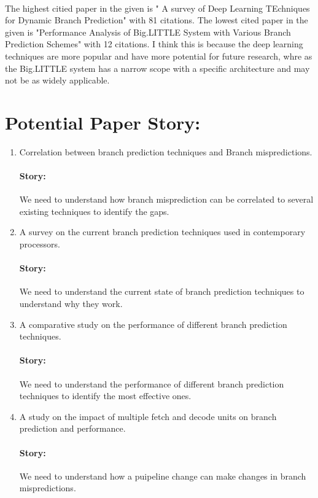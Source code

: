 \documentclass{article}
\begin{document}
\paragraph*{}
The highest citied paper  in the given is " A survey of Deep Learning TEchniques for Dynamic Branch Prediction" with 81 citations.
The lowest cited paper in the given is "Performance Analysis of Big.LITTLE System with Various Branch Prediction Schemes" with 12 citations.
I think this is because the deep learning techniques are more popular and have more potential for future research, whre as the Big.LITTLE system has a narrow scope with a specific architecture and may not be as widely applicable.

\section{Potential Paper Story: }
\begin{enumerate}
    \item Correlation between branch prediction techniques and Branch mispredictions. \paragraph{Story:} We need to understand how branch misprediction can be correlated to several existing techniques to identify the gaps.
    \item A survey on the current branch prediction techniques used in contemporary processors. \paragraph{Story: } We need to understand the current state of branch prediction techniques to understand why they work.
    \item A comparative study on the performance of different branch prediction techniques. \paragraph{Story: } We need to understand the performance of different branch prediction techniques to identify the most effective ones.
    \item A study on the impact of multiple fetch and decode units on branch prediction and performance. \paragraph{Story: } We need to understand how a puipeline change can make changes in branch mispredictions.
\end{enumerate}




\end{document}
